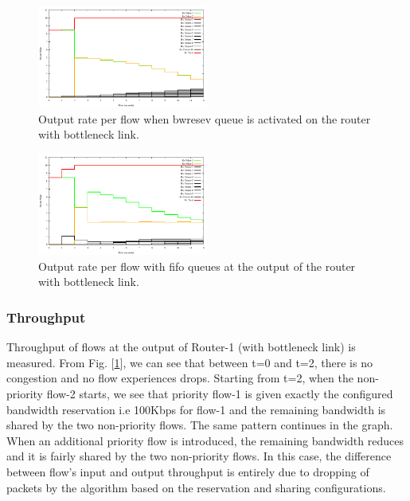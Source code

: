 \documentclass[10pt,sigconf,letterpaper,anonymous]{acmart}
\begin{document}
\begin{figure}[ht]
	\begin{center}
		\includegraphics[width=0.50\textwidth]{plots/rx_detnet.pdf}
		\caption{Output rate per flow when bwresev queue is activated on the router with bottleneck link.}\label{fig:rx_detnet}
	\end{center}
\end{figure}
\begin{figure}[ht]
	\begin{center}
		\includegraphics[width=0.50\textwidth]{plots/rx_fifo.pdf}
		\caption{Output rate per flow with fifo queues at the output of the router with bottleneck link.}\label{fig:rx_fifo}
	\end{center}
\end{figure}

\subsubsection{Throughput}
Throughput of flows at the output of Router-1 (with bottleneck link) is measured. From Fig. [\ref{fig:rx_detnet}], we can see that between t=0 and t=2, there is no congestion and no flow experiences drops. Starting from t=2, when the non-priority flow-2 starts, we see that priority flow-1 is given exactly the configured bandwidth reservation i.e 100Kbps for flow-1 and the remaining bandwidth is shared by the two non-priority flows. The same pattern continues in the graph. When an additional priority flow is introduced, the remaining bandwidth reduces and it is fairly shared by the two non-priority flows. In this case, the difference between flow's input and output throughput is entirely due to dropping of packets by the algorithm based on the reservation and sharing configurations. 
\end{document}
